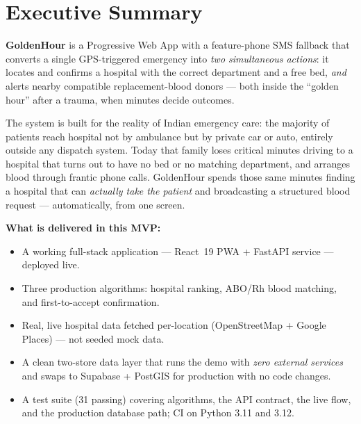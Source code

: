 \documentclass[11pt]{article}
\begin{document}
\tableofcontents
\thispagestyle{fancy}
\vspace{1cm}

\section{Executive Summary}

\textbf{GoldenHour} is a Progressive Web App with a feature-phone SMS fallback that
converts a single GPS-triggered emergency into \emph{two simultaneous actions}:
it locates and confirms a hospital with the correct department and a free bed,
\emph{and} alerts nearby compatible replacement-blood donors --- both inside the
``golden hour'' after a trauma, when minutes decide outcomes.

The system is built for the reality of Indian emergency care: the majority of
patients reach hospital not by ambulance but by private car or auto, entirely
outside any dispatch system. Today that family loses critical minutes driving to
a hospital that turns out to have no bed or no matching department, and arranges
blood through frantic phone calls. GoldenHour spends those same minutes finding a
hospital that can \emph{actually take the patient} and broadcasting a structured
blood request --- automatically, from one screen.

\medskip
\noindent\textbf{What is delivered in this MVP:}
\begin{itemize}
  \item A working full-stack application --- React~19 PWA + FastAPI service --- deployed live.
  \item Three production algorithms: hospital ranking, ABO/Rh blood matching, and first-to-accept confirmation.
  \item Real, live hospital data fetched per-location (OpenStreetMap + Google Places) --- not seeded mock data.
  \item A clean two-store data layer that runs the demo with \emph{zero external services} and swaps to Supabase + PostGIS for production with no code changes.
  \item A test suite (31 passing) covering algorithms, the API contract, the live flow, and the production database path; CI on Python 3.11 and 3.12.
\end{itemize}

\end{document}
